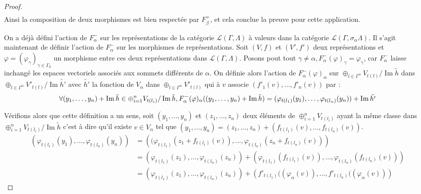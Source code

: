 \documentclass[a4paper,10pt]{article}
\DeclareMathOperator{\Img}{Im}
\begin{document}
\begin{proof}
\[\begin{array}{ll}
	\end{array}
\]
Ainsi la composition de deux morphismes est bien respectée par $F_{\beta}^{+}$, et cela conclue la preuve pour cette application.

On a déjà défini l'action de $F_{\alpha}^{-}$ sur les représentations de la catégorie $\mathscr L(\Gamma,\Lambda)$ à valeurs dans la catégorie $\mathscr L(\Gamma,\sigma_{\alpha}\Lambda)$. Il s'agit maintenant de définir l'action de $F_{\alpha}^{-}$ sur les morphismes de représentations. Soit $(V,f)$ et $(V',f')$ deux représentations et $\varphi = (\varphi_{\gamma})_{\gamma \in \Gamma_{0}}$ un morphisme entre ces deux représentations dans $\mathscr L(\Gamma,\Lambda)$. Posons pout tout $\gamma \neq \alpha, F_{\alpha}^{-}(\varphi)_{\gamma} = \varphi_{\gamma}$, car $F_{\alpha}^{-}$ laisse inchangé les espaces vectoriels associés aux sommets différents de $\alpha$. On définie alors l'action de  $F^{-}_{\alpha}(\varphi)_{\alpha}$ sur $\oplus_{l \in \Gamma^{\alpha}} V_{t(l)} / \Img \tilde{h}$  dans $\oplus_{l \in \Gamma^{\alpha}} V'_{t(l)} / \Img \tilde{h'}$ avec $\tilde{h'}$ la fonction de $V_{\alpha}$ dans  $\oplus_{l \in \Gamma^{\alpha}} V'_{t(l)}$ qui à $v$ associe $(f'_{1}(v), \dots , f'_{n}(v))$ par : 
\[
\forall(y_{1}, \dots, y_{n})+ \Img \tilde{h} \in  \oplus_{ i=1}^{n} V_{t(l_{i})} / \Img \tilde{h}, \\ 
F_{\alpha}^{-}(\varphi)_{\alpha}((y_{1}, \dots, y_{n}) +\Img \tilde{h}) = (\varphi_{t(l_{1})}(y_{1}), \dots , \varphi_{t(l_{n})}(y_{n})) + \Img \tilde{h'}
\]

Vérifions alors que cette définition a un sens, soit $(y_{1}, \dots, y_{n})$ et $(z_{1}, \dots , z_{n})$ deux éléments de $\oplus_{i=1}^{n} V_{t(l_{i})}$ ayant la même classe dans $\oplus_{i=1}^{n} V_{t(l_{i})} / \Img \tilde{h}$ c'est à dire qu'il existe $v \in V_{\alpha}$ tel que  $(y_{1}, \dots, y_{n}) = (z_{1}, \dots , z_{n}) + (f_{t(l_{1})}(v), \dots, f_{t(l_{n})}(v))$.
\[
\begin{array}{ll}
  \left(\varphi_{t(l_{1})}(y_{1}), \dots, \varphi_{t(l_{n})}(y_{n}) \right) &= \left((\varphi_{t(l_{1})}(z_{1} + f_{t(l_{1})}(v)), \dots, \varphi_{t(l_{n})}(z_{n} + f_{t(l_{n})}(v))\right) \\
  &= \left(\varphi_{t(l_{1})}(z_{1}), \dots, \varphi_{t(l_{n})}(z_{n})\right) + \left(\varphi_{t(l_{1})}(f_{t(l_{1})}(v)), \dots, \varphi_{t(l_{n})}(f_{t(l_{n})}(v)) \right)\\
&= \left(\varphi_{t(l_{1})}(z_{1}), \dots, \varphi_{t(l_{n})}(z_{n})\right) + \left(f'_{t(l_{1})}((\varphi_{\alpha}(v)), \dots, f'_{t(l_{n})}((\varphi_{\alpha}(v)) \right)
\end{array}
\]


\end{proof}
\end{document}
